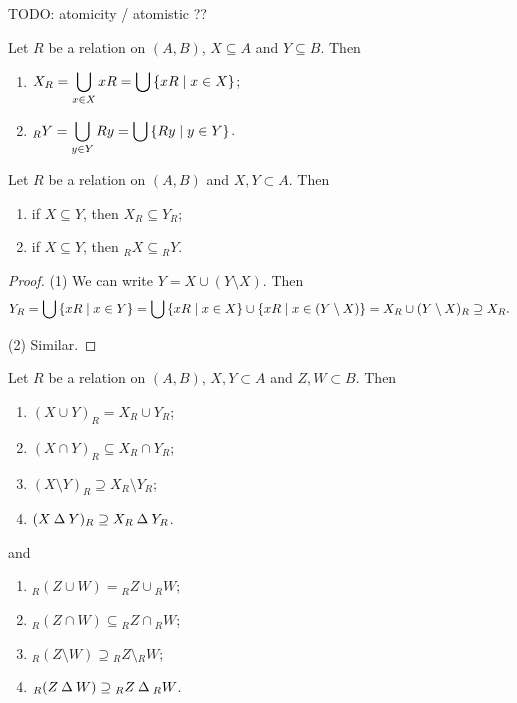 TODO: atomicity / atomistic ??
\begin{lemma}
Let $R$ be a relation on $(A, B)$, $X\subseteq A$ and $Y\subseteq B$. Then
\begin{enumerate}
\item $X_R = \displaystyle\bigcup_{x\in X}xR = \bigcup \left\{ xR \;\middle|\; x\in X \right\}$;
\item $_RY = \displaystyle\bigcup_{y\in Y}Ry = \bigcup \left\{ Ry \;\middle|\; y\in Y \right\}$.
\end{enumerate}
\end{lemma}


\begin{corollary} \label{monotonicityImage}
Let $R$ be a relation on $(A, B)$ and $X,Y\subset A$. Then
\begin{enumerate}
\item if $X\subseteq Y$, then $X_R \subseteq Y_R$;
\item if $X\subseteq Y$, then ${_RX} \subseteq {_RY}$.
\end{enumerate}
\end{corollary}
\begin{proof}
(1) We can write $Y = X \cup (Y\setminus X)$. Then
\[ Y_R = \bigcup \left\{ xR \;\middle|\; x\in Y \right\} = \bigcup \left\{ xR \;\middle|\; x\in X \right\}\cup\left\{ xR \;\middle|\; x\in (Y\setminus X) \right\} = X_R \cup (Y\setminus X)_R \supseteq X_R. \]

(2) Similar.
\end{proof}
\begin{corollary} \label{imageRelation} \label{preimageRelation}
Let $R$ be a relation on $(A, B)$, $X,Y\subset A$ and $Z,W\subset B$. Then
\begin{enumerate}
\item $(X\cup Y)_R = X_R\cup Y_R$;
\item $(X\cap Y)_R \subseteq X_R\cap Y_R$;
\item $(X\setminus Y)_R \supseteq X_R\setminus Y_R$;
\item $(X\mathbin{\Delta} Y)_R \supseteq X_R\mathbin{\Delta} Y_R$.
\end{enumerate}
and
\begin{enumerate}
\item $_R(Z\cup W) = {_RZ}\cup {_RW}$;
\item $_R(Z\cap W) \subseteq {_RZ}\cap {_RW}$;
\item $_R(Z\setminus W) \supseteq {_RZ}\setminus {_RW}$;
\item $_R(Z\mathbin{\Delta} W) \supseteq {_RZ}\mathbin{\Delta} {_RW}$.
\end{enumerate}
\end{corollary}
